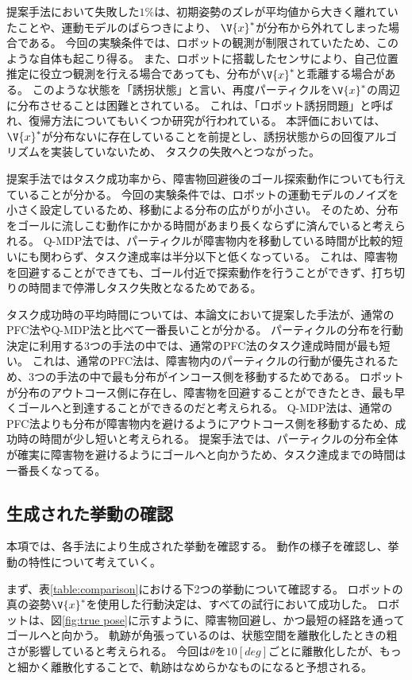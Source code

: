 提案手法において失敗した$1\%$は、初期姿勢のズレが平均値から大きく離れていたことや、運動モデルのばらつきにより、
$\V{x}^{*}$が分布から外れてしまった場合である。
今回の実験条件では、ロボットの観測が制限されていたため、このような自体も起こり得る。
また、ロボットに搭載したセンサにより、自己位置推定に役立つ観測を行える場合であっても、分布が$\V{x}^{*}$と乖離する場合がある。
このような状態を「誘拐状態」と言い、再度パーティクルを$\V{x}^{*}$の周辺に分布させることは困難とされている。
これは、「ロボット誘拐問題」と呼ばれ、復帰方法についてもいくつか研究が行われている\cite{lenser2000etal, aa}。
本評価においては、$\V{x}^{*}$が分布ないに存在していることを前提とし、誘拐状態からの回復アルゴリズムを実装していないため、
タスクの失敗へとつながった。

提案手法ではタスク成功率から、障害物回避後のゴール探索動作についても行えていることが分かる。
今回の実験条件では、ロボットの運動モデルのノイズを小さく設定しているため、移動による分布の広がりが小さい。
そのため、分布をゴールに流しこむ動作にかかる時間があまり長くならずに済んでいると考えられる。
Q-MDP法では、パーティクルが障害物内を移動している時間が比較的短いにも関わらず、タスク達成率は半分以下と低くなっている。
これは、障害物を回避することができても、ゴール付近で探索動作を行うことができず、打ち切りの時間まで停滞しタスク失敗となるためである。

タスク成功時の平均時間については、本論文において提案した手法が、通常のPFC法やQ-MDP法と比べて一番長いことが分かる。
パーティクルの分布を行動決定に利用する3つの手法の中では、通常のPFC法のタスク達成時間が最も短い。
これは、通常のPFC法は、障害物内のパーティクルの行動が優先されるため、3つの手法の中で最も分布がインコース側を移動するためである。
ロボットが分布のアウトコース側に存在し、障害物を回避することができたとき、最も早くゴールへと到達することができるのだと考えられる。
Q-MDP法は、通常のPFC法よりも分布が障害物内を避けるようにアウトコース側を移動するため、成功時の時間が少し短いと考えられる。
提案手法では、パーティクルの分布全体が確実に障害物を避けるようにゴールへと向かうため、タスク達成までの時間は一番長くなってる。


\subsection{生成された挙動の確認}
本項では、各手法により生成された挙動を確認する。
動作の様子を確認し、挙動の特性について考えていく。

まず、表\ref{table:comparison}における下2つの挙動について確認する。
ロボットの真の姿勢$\V{x}^{*}$を使用した行動決定は、すべての試行において成功した。
ロボットは、図\ref{fig:true pose}に示すように、障害物回避し、かつ最短の経路を通ってゴールへと向かう。
軌跡が角張っているのは、状態空間を離散化したときの粗さが影響していると考えられる。
今回は$\theta$を$10[\si{deg}]$ごとに離散化したが、もっと細かく離散化することで、軌跡はなめらかなものになると予想される。

